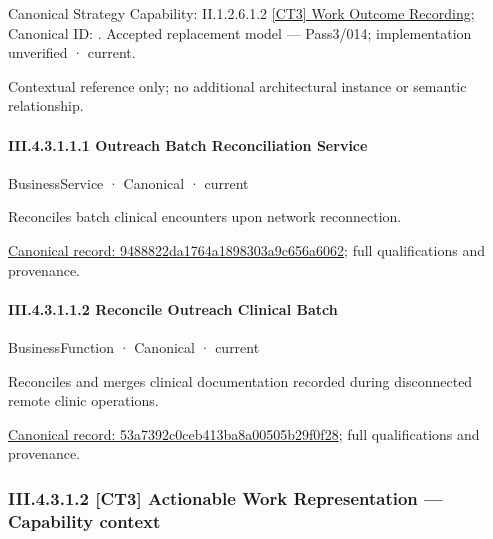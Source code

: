 {\small Canonical Strategy Capability: II.1.2.6.1.2 \hyperref[element:d415d47258b64b8ca9f1411da923e8d5]{[CT3] Work Outcome Recording}; Canonical ID: \texttt{}. Accepted replacement model — Pass3/014; implementation unverified · current.}\par
Contextual reference only; no additional architectural instance or semantic relationship.\par
\paragraph*{III.4.3.1.1.1 Outreach Batch Reconciliation Service}
\label{navigation:III.4.3.1.1.1}

\label{element:9488822da1764a1898303a9c656a6062}
{\small BusinessService · Canonical · current}\par

Reconciles batch clinical encounters upon network reconnection.


{\footnotesize \href{../../../../../../../../continuum/business/business-service/9488822da1764a1898303a9c656a6062.md}{Canonical record: 9488822da1764a1898303a9c656a6062}; full qualifications and provenance.}\par
\paragraph*{III.4.3.1.1.2 Reconcile Outreach Clinical Batch}
\label{navigation:III.4.3.1.1.2}

\label{element:53a7392c0ceb413ba8a00505b29f0f28}
{\small BusinessFunction · Canonical · current}\par

Reconciles and merges clinical documentation recorded during disconnected remote clinic operations.


{\footnotesize \href{../../../../../../../../continuum/business/business-function/53a7392c0ceb413ba8a00505b29f0f28.md}{Canonical record: 53a7392c0ceb413ba8a00505b29f0f28}; full qualifications and provenance.}\par
\subsubsection*{III.4.3.1.2 [CT3] Actionable Work Representation — Capability context}
\label{navigation:III.4.3.1.2}

